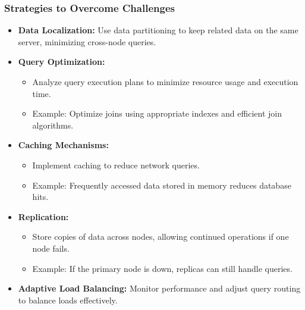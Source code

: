 \documentclass[aspectratio=169]{beamer}
\begin{document}
\begin{frame}[fragile]
    \frametitle{Strategies to Overcome Challenges}
    
    \begin{itemize}
        \item \textbf{Data Localization:} Use data partitioning to keep related data on the same server, minimizing cross-node queries.
        
        \item \textbf{Query Optimization:}
            \begin{itemize}
                \item Analyze query execution plans to minimize resource usage and execution time.
                \item Example: Optimize joins using appropriate indexes and efficient join algorithms.
            \end{itemize}
        
        \item \textbf{Caching Mechanisms:}
            \begin{itemize}
                \item Implement caching to reduce network queries.
                \item Example: Frequently accessed data stored in memory reduces database hits.
            \end{itemize}
        
        \item \textbf{Replication:}
            \begin{itemize}
                \item Store copies of data across nodes, allowing continued operations if one node fails.
                \item Example: If the primary node is down, replicas can still handle queries.
            \end{itemize}
        
        \item \textbf{Adaptive Load Balancing:} Monitor performance and adjust query routing to balance loads effectively.
    \end{itemize}
\end{frame}
\end{document}

